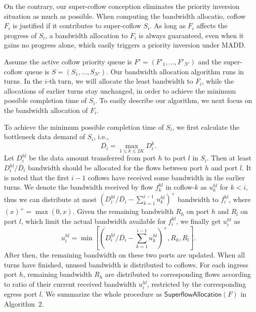 \documentclass[10pt, conference, letterpaper]{IEEEtran}
\begin{document}
On the contrary, our super-coflow conception eliminates the priority inversion situation as much as possible. When computing the bandwidth allocatio, coflow $F_i$ is justified if it contributes to super-coflow $S_i$. As long as $F_i$ affects the progress of $S_i$, a bandwidth allocation to $F_i$ is always guaranteed, even when it gains no progress alone, which easily triggers a priority inversion under MADD.

Assume the active coflow priority queue is $F'=(F'_1,\dots,F'_{N'})$ and the super-coflow queue is $S = (S_1,\dots,S_{N'})$. Our bandwidth allocation algorithm runs in turns. In the $i$-th turn, we will allocate the least bandwidth to $F_i$, while the allocations of earlier turns stay unchanged,  in order to achieve the minimum possible completion time of $S_i$. To easily describe our algorithm, we next focus on the bandwidth allocation of $F_i$.

To achieve the minimum possible completion time of $S_i$, we first calculate the bottleneck data demand of $S_i$, i.e.,
\begin{equation}
	\overline{D_i} = \max_{1\leq k\leq 2K}D_i^k.
\end{equation}
Let $D_i^{hl}$ be the data amount transferred from port $h$ to port $l$ in $S_i$. Then at least $D_i^{hl}/\overline{D_i}$ bandwidth should be allocated for the flows between port $h$ and port $l$. It is noted that the first $i-1$ coflows have received some bandwidth in the earlier turns. We denote the bandwidth received by flow $f_k^{hl}$ in coflow-$k$ as $u_k^{hl}$ for $k < i$, thus we can distribute at most $(D_i^{hl}/\overline{D_i} - \sum_{k=1}^{i-1}u_k^{hl})^+$ bandwidth to $f_i^{hl}$, where $(x)^+=\max(0,x)$. Given the remaining bandwidth $R_h$ on port $h$ and $R_l$ on port $l$, which limit the actual bandwidth available for $f_i^{hl}$, we finally get $u_i^{hl}$ as
\begin{equation}
	u_i^{hl} = \min\left[\left(D_i^{hl}/\overline{D_i} - \sum_{k=1}^{i-1}u_k^{hl}\right)^+,R_h,R_l\right].
\end{equation}
After then, the remaining bandwidth on these two ports are updated. When all turns have finished, unused bandwidth is distributed to coflows. For each ingress port $h$, remaining bandwidth $R_h$ are distributed to corresponding flows according to ratio of their current received bandwidth $u_i^{hl}$, restricted by the corresponding egress port $l$. We summarize the whole procedure as $\mathsf{SuperflowAllocation}(F)$ in Algorithm~2.
\end{document}
